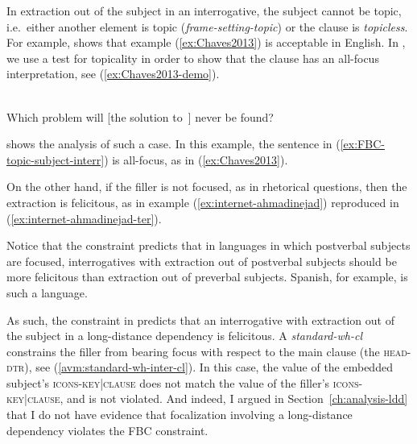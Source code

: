 In extraction out of the subject in an interrogative, the subject cannot be topic, i.e.\ either another element is topic (\emph{frame-setting-topic}) or the clause is \emph{topicless}. For example, \citeauthor{Chaves.2013} shows that example (\ref{ex:Chaves2013}) is acceptable in English. In \citet{Abeille.2020.Cognition}, we use a test for topicality in order to show that the clause has an all-focus interpretation, see (\ref{ex:Chaves2013-demo}). 

\ea \citep[313]{Chaves.2013}\\
Which problem will [the solution to~\trace{}] never be found? 
\label{ex:Chaves2013} 
\z 

\eal \label{ex:Chaves2013-demo}
\zl 

 shows the analysis of such a case. In this example, the sentence in (\ref{ex:FBC-topic-subject-interr}) is all-focus, as in (\ref{ex:Chaves2013}).

On the other hand, if the filler is not focused, as in rhetorical questions, then the extraction is felicitous, as in example (\ref{ex:internet-ahmadinejad}) reproduced in (\ref{ex:internet-ahmadinejad-ter}).

\label{ex:internet-ahmadinejad-ter}
\z 

Notice that the constraint predicts that in languages in which postverbal subjects are focused, interrogatives with extraction out of postverbal subjects should be more felicitous than extraction out of preverbal subjects. Spanish, for example, is such a language.

As such, the constraint in  predicts that an interrogative with extraction out of the subject in a long-distance dependency is felicitous. A \emph{standard-wh-cl} constrains the filler from bearing focus with respect to the main clause (the \textsc{head-dtr}), see (\ref{avm:standard-wh-inter-cl}). In this case, the value of the embedded subject's \textsc{icons-key|clause} does not match the value of the filler's \textsc{icons-key|clause}, and  is not violated.
And indeed, I argued in Section~\ref{ch:analysis-ldd} that I do not have evidence that focalization involving a long-distance dependency violates the FBC constraint.

